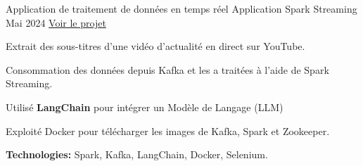 

\begin{cventries}

\cventry
    {Application de traitement de données en temps réel} %
    {Application Spark Streaming } %
    {Mai 2024} %
    {{\href{https://github.com/Gouranegithub/News_Streaming_Analysis}{Voir le projet}}} %
    {
      \begin{cvitems} %
        \item {Extrait des sous-titres d'une vidéo d'actualité en direct sur YouTube.}
        \item {Consommation des données depuis Kafka et les a traitées à l'aide de Spark Streaming.}
        \item {Utilisé \textbf{LangChain} pour intégrer un Modèle de Langage (LLM)}
        \item {Exploité Docker pour télécharger les images de Kafka, Spark et Zookeeper.}
        \item {\textbf{Technologies:}  Spark, Kafka, LangChain, Docker, Selenium.\\}
      \end{cvitems}
    }
    
    


\end{cventries}
